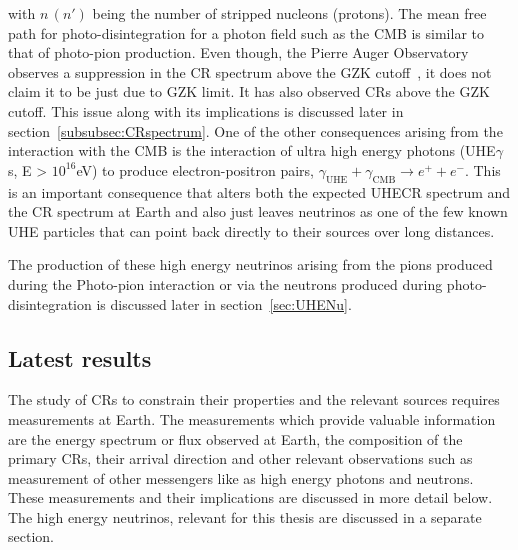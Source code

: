with $n\,(n')$ being the number of stripped nucleons (protons). The mean free path for photo-disintegration for a photon field such as the CMB is similar to that of photo-pion production. Even though, the Pierre Auger Observatory observes a suppression in the \gls{CR} spectrum above the \gls{GZK} cutoff~\cite{KAMPERT2014318}, it does not claim it to be just due to GZK limit. It has also observed \glspl{CR} above the \gls*{GZK} cutoff. This issue along with its implications is discussed later in section~\ref{subsubsec:CRspectrum}. One of the other consequences arising from the interaction with the CMB is the interaction of ultra high energy photons (UHE$\gamma$s, E > $10^{16}$eV) to produce electron-positron pairs, $\gamma_{\text{UHE}} + \gamma_{\text{CMB}} \longrightarrow e^+ + e^- $. This is an important consequence that alters both the expected \gls{UHECR} spectrum and the CR spectrum at Earth and also just leaves neutrinos as one of the few known UHE particles that can point back directly to their sources over long distances.

The production of these high energy neutrinos arising from the pions produced during the Photo-pion interaction or via the neutrons produced during photo-disintegration is discussed later in section~\ref{sec:UHENu}. 

\subsection{Latest results}
\label{subsec:CRresults}
The study of \glspl{CR} to constrain their properties and the relevant sources requires measurements at Earth. The measurements which provide valuable information are the energy spectrum or flux observed at Earth, the composition of the primary \glspl{CR}, their arrival direction and other relevant observations such as measurement of other messengers like as high energy photons and neutrons. These measurements and their implications are discussed in more detail below. The high energy neutrinos, relevant for this thesis are discussed in a separate section. 

